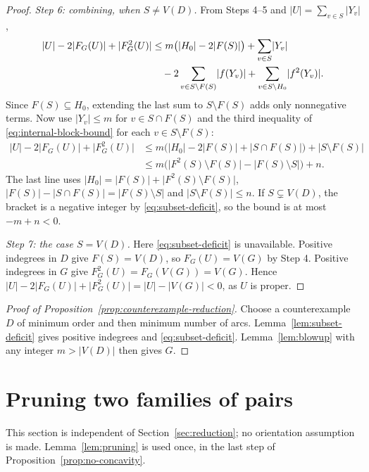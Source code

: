 \documentclass[11pt]{article}
\theoremstyle{remark}
\newcommand{\abs}[1]{\lvert #1\rvert}
\begin{document}
\begin{proof}
\smallskip\noindent\emph{Step 6: combining, when $S\ne V(D)$.}
From Steps 4--5 and $\abs U=\sum_{v\in S}\abs{Y_v}$,
\begin{align}
\label{eq:blowup-sharp}
  \abs{U}-2\abs{F_G(U)}+\abs{F_G^2(U)}
  &\le m\bigl(\abs{H_0}-2\abs{F(S)}\bigr)
       +\sum_{v\in S}\abs{Y_v} \notag\\
  &\quad -2\sum_{v\in S\setminus F(S)}\abs{f(Y_v)}
       +\sum_{v\in S\setminus H_0}\abs{f^2(Y_v)}.
\end{align}
Since $F(S)\subseteq H_0$, extending the last sum to $S\setminus F(S)$ adds
only nonnegative terms.  Now use $\abs{Y_v}\le m$ for $v\in S\cap F(S)$ and
the third inequality of \eqref{eq:internal-block-bound} for each
$v\in S\setminus F(S)$:
\begin{align*}
  \abs{U}-2\abs{F_G(U)}+\abs{F_G^2(U)}
  &\le m\bigl(\abs{H_0}-2\abs{F(S)}
                    +\abs{S\cap F(S)}\bigr)
       +\abs{S\setminus F(S)}\\
  &\le m\bigl(\abs{F^2(S)\setminus F(S)}
                    -\abs{F(S)\setminus S}\bigr)+n.
\end{align*}
The last line uses $\abs{H_0}=\abs{F(S)}+\abs{F^2(S)\setminus F(S)}$,
$\abs{F(S)}-\abs{S\cap F(S)}=\abs{F(S)\setminus S}$ and
$\abs{S\setminus F(S)}\le n$.  If $S\subsetneq V(D)$, the bracket is a
negative integer by \eqref{eq:subset-deficit}, so the bound is at most
$-m+n<0$.

\smallskip\noindent\emph{Step 7: the case $S=V(D)$.}
Here \eqref{eq:subset-deficit} is unavailable.  Positive indegrees in $D$
give $F(S)=V(D)$, so $F_G(U)=V(G)$ by Step 4.  Positive indegrees in $G$
give $F_G^2(U)=F_G(V(G))=V(G)$.  Hence
$\abs{U}-2\abs{F_G(U)}+\abs{F_G^2(U)}=\abs{U}-\abs{V(G)}<0$, as $U$ is
proper.
\end{proof}

\begin{proof}[Proof of Proposition~\ref{prop:counterexample-reduction}]
Choose a counterexample $D$ of minimum order and then minimum number of
arcs.  Lemma~\ref{lem:subset-deficit} gives positive indegrees and
\eqref{eq:subset-deficit}.  Lemma~\ref{lem:blowup} with any integer
$m>\abs{V(D)}$ then gives $G$.
\end{proof}

\section{Pruning two families of pairs}\label{sec:pruning}

This section is independent of Section~\ref{sec:reduction}; no orientation
assumption is made.  Lemma~\ref{lem:pruning} is used once, in the last step
of Proposition~\ref{prop:no-concavity}.
\end{document}
